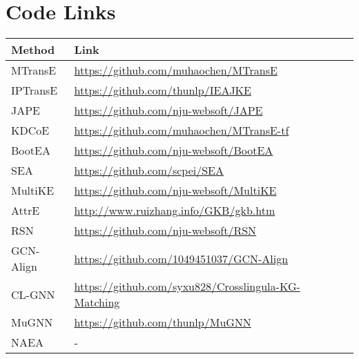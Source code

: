 \documentclass[runningheads]{llncs}
\begin{document}
\section*{Code Links}
\begin{center}
\begin{tabular*}{\linewidth}{*{4}{@{\extracolsep{\fill}}l}@{\extracolsep{\fill}}}
\toprule
Method & Link \\
\midrule
MTransE \cite{DBLP:conf/ijcai/ChenTYZ17} & \url{https://github.com/muhaochen/MTransE}\\
IPTransE \cite{DBLP:conf/ijcai/ZhuXLS17} & \url{https://github.com/thunlp/IEAJKE}\\
JAPE \cite{DBLP:conf/semweb/SunHL17} & \url{https://github.com/nju-websoft/JAPE}\\
KDCoE \cite{DBLP:conf/ijcai/ChenTCSZ18} & \url{https://github.com/muhaochen/MTransE-tf} \\
BootEA \cite{DBLP:conf/ijcai/SunHZQ18} & \url{https://github.com/nju-websoft/BootEA}\\
SEA \cite{DBLP:conf/www/PeiYHZ19} & \url{https://github.com/scpei/SEA} \\
MultiKE \cite{DBLP:conf/ijcai/ZhangSHCGQ19} & \url{https://github.com/nju-websoft/MultiKE} \\
AttrE \cite{DBLP:conf/aaai/TrisedyaQZ19} & \url{http://www.ruizhang.info/GKB/gkb.htm} \\
RSN \cite{DBLP:conf/icml/GuoSH19} & \url{https://github.com/nju-websoft/RSN}\\
GCN-Align \cite{DBLP:conf/emnlp/WangLLZ18} & \url{https://github.com/1049451037/GCN-Align}\\
CL-GNN \cite{DBLP:conf/acl/XuWYFSWY19} & \url{https://github.com/syxu828/Crosslingula-KG-Matching} \\
MuGNN \cite{DBLP:conf/acl/CaoLLLLC19} & \url{https://github.com/thunlp/MuGNN}\\
NAEA \cite{DBLP:conf/ijcai/ZhuZ0TG19} & - \\
\bottomrule
\end{tabular*}    
\end{center}
\end{document}
